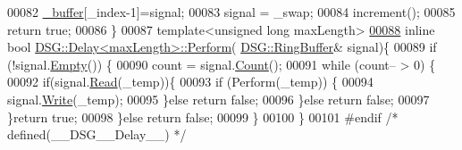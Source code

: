 \begin{DoxyCode}
00082         \hyperlink{_driver_8cpp_acce4d24812914a6b276156d1a3d3e851}{\_buffer}[\_index-1]=signal;
00083         signal = \_swap;
00084         increment();
00085         \textcolor{keywordflow}{return} \textcolor{keyword}{true};
00086     \}
00087     \textcolor{keyword}{template}<\textcolor{keywordtype}{unsigned} \textcolor{keywordtype}{long} maxLength>
\hypertarget{_delay_8h_source_l00088}{}\hyperlink{class_d_s_g_1_1_delay_a205bd6fc25ea951395943eae51128e66}{00088}     \textcolor{keyword}{inline} \textcolor{keywordtype}{bool} \hyperlink{class_d_s_g_1_1_delay_afe853b73a1d7d1e5720277e5d956b209}{DSG::Delay<maxLength>::Perform}(
      \hyperlink{class_d_s_g_1_1_ring_buffer}{DSG::RingBuffer}& signal)\{
00089         \textcolor{keywordflow}{if} (!signal.\hyperlink{class_d_s_g_1_1_ring_buffer_ac1346f5842d08b988a5297abe4089b96}{Empty}()) \{
00090             count = signal.\hyperlink{class_d_s_g_1_1_ring_buffer_a9bd79b0a6dff618b205e396c101ee070}{Count}();
00091             \textcolor{keywordflow}{while} (count-- > 0) \{
00092                 \textcolor{keywordflow}{if}(signal.\hyperlink{class_d_s_g_1_1_ring_buffer_a6b2848a64f15c7b0c320779582fa0fbe}{Read}(\_temp))\{
00093                     \textcolor{keywordflow}{if} (Perform(\_temp)) \{
00094                         signal.\hyperlink{class_d_s_g_1_1_ring_buffer_aa5dd2caa0a270173251faee40a43d692}{Write}(\_temp);
00095                     \}\textcolor{keywordflow}{else} \textcolor{keywordflow}{return} \textcolor{keyword}{false};
00096                 \}\textcolor{keywordflow}{else} \textcolor{keywordflow}{return} \textcolor{keyword}{false};
00097             \}\textcolor{keywordflow}{return} \textcolor{keyword}{true};
00098         \}\textcolor{keywordflow}{else} \textcolor{keywordflow}{return} \textcolor{keyword}{false};
00099     \}
00100 \}
00101 \textcolor{preprocessor}{#endif }\textcolor{comment}{/* defined(\_\_DSG\_\_Delay\_\_) */}\textcolor{preprocessor}{}
\end{DoxyCode}
